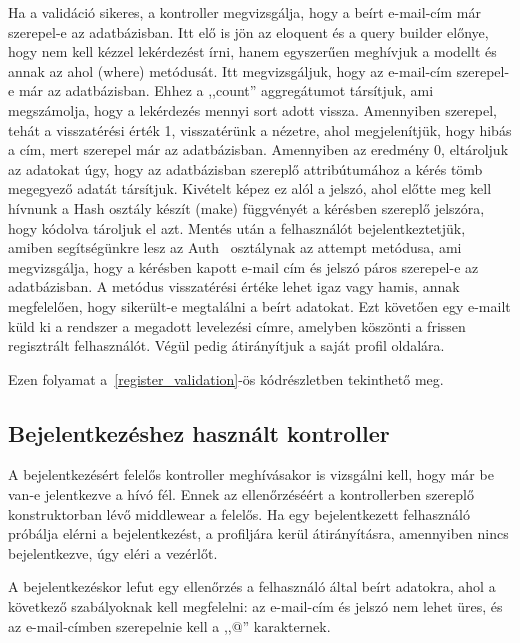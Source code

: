 \documentclass[
]{thesis-ekf}
\theoremstyle{definition}
\theoremstyle{remark}
\begin{document}
	Ha a validáció sikeres, a kontroller megvizsgálja, hogy a beírt e-mail-cím már szerepel-e az adatbázisban. Itt elő is jön az eloquent és a query builder előnye, hogy nem kell kézzel lekérdezést írni, hanem egyszerűen meghívjuk a modellt és annak az ahol (where) metódusát. Itt megvizsgáljuk, hogy az e-mail-cím szerepel-e már az adatbázisban. Ehhez a ,,count'' aggregátumot társítjuk, ami megszámolja, hogy a lekérdezés mennyi sort adott vissza. Amennyiben szerepel, tehát a visszatérési érték 1, visszatérünk a nézetre, ahol megjelenítjük, hogy hibás a cím, mert szerepel már az adatbázisban. Amennyiben az eredmény 0, eltároljuk az adatokat úgy, hogy az adatbázisban szereplő attribútumához a kérés tömb megegyező adatát társítjuk. Kivételt képez ez alól a jelszó, ahol előtte meg kell hívnunk a Hash osztály készít (make) függvényét a kérésben szereplő jelszóra, hogy kódolva tároljuk el azt. Mentés után a felhasználót bejelentkeztetjük, amiben segítségünkre lesz az Auth~\cite{laravel_auth} osztálynak az attempt metódusa, ami megvizsgálja, hogy a kérésben kapott e-mail cím és jelszó páros szerepel-e az adatbázisban. A metódus visszatérési értéke lehet igaz vagy hamis, annak megfelelően, hogy sikerült-e megtalálni a beírt adatokat. Ezt követően egy e-mailt küld ki a rendszer a megadott levelezési címre, amelyben köszönti a frissen regisztrált felhasználót. Végül pedig átirányítjuk a saját profil oldalára.
	
	Ezen folyamat a~\ref{register_validation}-ös kódrészletben tekinthető meg.
	
	
	
	\subsection{Bejelentkezéshez használt kontroller}
	A bejelentkezésért felelős kontroller meghívásakor is vizsgálni kell, hogy már be van-e jelentkezve a hívó fél. Ennek az ellenőrzéséért a kontrollerben szereplő konstruktorban lévő middlewear a felelős. Ha egy bejelentkezett felhasználó próbálja elérni a bejelentkezést, a profiljára kerül átirányításra, amennyiben nincs bejelentkezve, úgy eléri a vezérlőt.
	
	A bejelentkezéskor lefut egy ellenőrzés a felhasználó által beírt adatokra, ahol a következő szabályoknak kell megfelelni: az e-mail-cím és jelszó nem lehet üres, és az e-mail-címben szerepelnie kell a ,,@'' karakternek.
	
\end{document}
